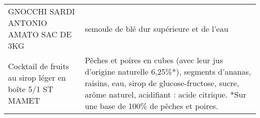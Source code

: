 \begin{longtable}{p{5cm}p{10cm}}
                                                                   GNOCCHI SARDI ANTONIO AMATO SAC DE 3KG &                                                                                                                                                                                                                                                                                                                                                                                                                                                                                                                                                                                                                                                                                                                                                                                                                                                                                                                                                                                                semoule de blé dur supérieure et de l'eau \\
                                                  Cocktail de fruits au sirop léger en boîte 5/1 ST MAMET &                                                                                                                                                                                                                                                                                                                                                                                                                                                                                                                                                                                                                                                                                                                                                                                                         Pêches et poires en cubes (avec leur jus d'origine naturelle 6,25\%*), segments d'ananas, raisins, eau, sirop de glucose-fructose, sucre, arôme naturel, acidifiant : acide citrique.  *Sur une base de 100\% de pêches et poires. \\

\end{longtable}
